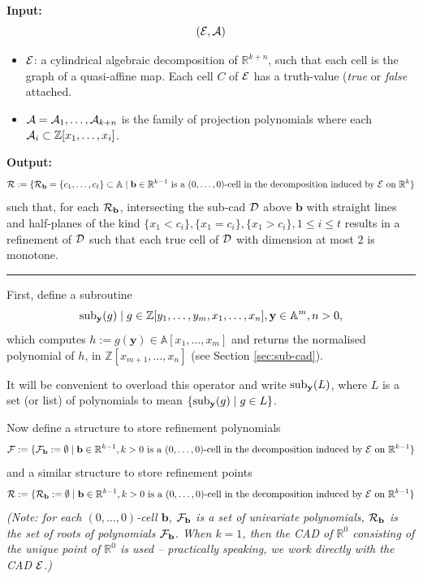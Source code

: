 \documentclass[
]{book}
\theoremstyle{definition}
\theoremstyle{definition}
\theoremstyle{definition}
\theoremstyle{definition}
\theoremstyle{remark}
\begin{document}
\textbf{Input:}
\[({\cal E}, {\cal A})\]

\begin{itemize}
\item
  \(\cal E\): a cylindrical algebraic decomposition of \(\mathbb{R}^{k+n}\), such that each cell is the graph of a quasi-affine map. Each cell \(C\) of \(\cal E\) has a truth-value (\emph{true} or \emph{false} attached.
\item
  \({\cal A} = {\cal A}_1,\ldots,{\cal A}_{k+n}\) is the family of projection polynomials where each \({\cal A}_i \subset \mathbb{Z}[x_1,\ldots,x_i]\).
\end{itemize}

\textbf{Output:}
\[
{\cal R} := \{ {\cal R}_{\mathbf{b}} = \{ c_1,\ldots,c_t \} \subset \mathbb{A}\mid \mathbf{b} \in \mathbb{R}^{k-1} \text{ is a } (0,\ldots,0) \text{-cell in the decomposition induced by } {\cal E} \text{ on } \mathbb{R}^k \}
\]
such that, for each \({\cal R}_\mathbf{b}\), intersecting the sub-cad \(\cal D\) above \(\mathbf{b}\) with straight lines and half-planes of the kind \(\{x_1 < c_i \}, \{x_1 = c_i \}, \{x_1 > c_i\}, 1 \le i \le t\) results in a refinement of \(\cal D\) such that each true cell of \(\cal D\) with dimension at most \(2\) is monotone.

\begin{center}\rule{0.5\linewidth}{0.5pt}\end{center}

First, define a subroutine
\[{\rm sub}_{\mathbf{y}} (g) \mid g \in \mathbb{Z}[y_1,\ldots,y_m,x_1,\ldots,x_n], \mathbf{y} \in \mathbb{A}^m, n > 0,\]
which computes \(h := g(\mathbf{y}) \in \mathbb{A}[x_{1},\ldots,x_m]\) and returns the normalised polynomial of \(h\), in \(\mathbb{Z}[x_{m+1},\ldots,x_n]\) (see Section \ref{sec:sub-cad}).

It will be convenient to overload this operator and write \({\rm sub}_{\mathbf{y}} (L)\), where \(L\) is a set (or list) of polynomials to mean \(\{ {\rm sub}_{\mathbf{y}} (g) \mid g \in L \}\).

Now define a structure to store refinement polynomials
\[
{\cal F} := \{ {\cal F}_{\mathbf{b}} := \emptyset \mid \mathbf{b} \in \mathbb{R}^{k-1}, k > 0 \text{ is a } (0,\ldots,0) \text{-cell in the decomposition induced by } {\cal E} \text{ on } \mathbb{R}^{k-1} \}
\]
and a similar structure to store refinement points
\[
{\cal R} := \{ {\cal R}_{\mathbf{b}} := \emptyset \mid \mathbf{b} \in \mathbb{R}^{k-1}, k > 0 \text{ is a } (0,\ldots,0) \text{-cell in the decomposition induced by } {\cal E} \text{ on } \mathbb{R}^{k-1} \}
\]
\emph{(Note: for each \((0,\ldots,0)\)-cell \(\mathbf{b}\), \({\cal F}_\mathbf{b}\) is a set of univariate polynomials, \({\cal R}_{\mathbf{b}}\) is the set of roots of polynomials \({\cal F}_\mathbf{b}\). When \(k=1\), then the CAD of \(\mathbb{R}^0\) consisting of the unique point of \(\mathbb{R}^0\) is used -- practically speaking, we work directly with the CAD \(\cal E\).)}
\end{document}
